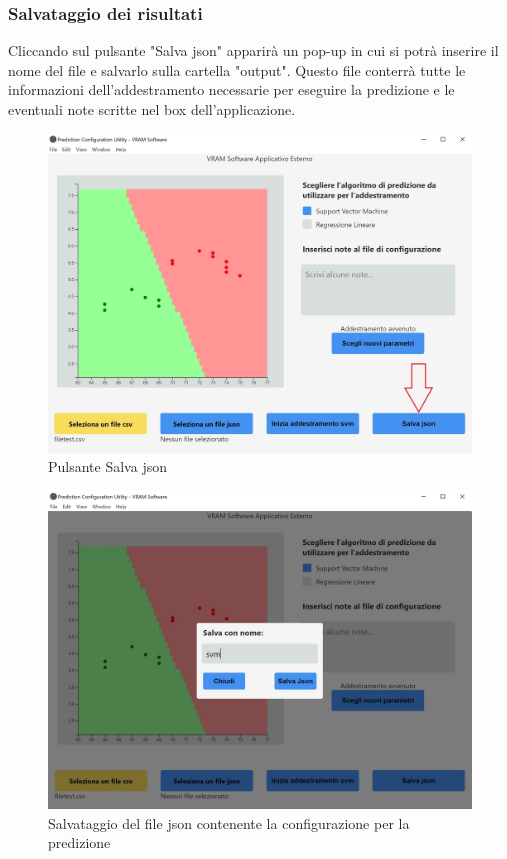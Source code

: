 		\subsubsection{Salvataggio dei risultati}
		Cliccando sul pulsante "Salva json" apparirà un pop-up in cui si potrà inserire il nome del file e salvarlo sulla cartella "output". Questo file conterrà tutte le informazioni dell'addestramento necessarie per eseguire la predizione e le eventuali note scritte nel box dell'applicazione.
		\mbox{}
		\begin{figure} [H]
			\begin{center}
				\includegraphics[width=\linewidth]{./img/4-2.jpg}
			\end{center}
			\caption{Pulsante Salva json}
		\end{figure}
		\mbox{}
		\mbox{}
		\begin{figure} [H]
			\begin{center}
				\includegraphics[width=\linewidth]{./img/5.jpg}
			\end{center}
			\caption{Salvataggio del file json contenente la configurazione per la predizione}
		\end{figure}
		\mbox{}
		
